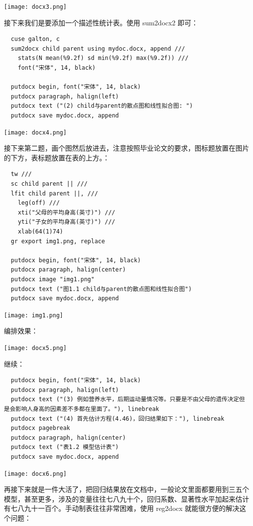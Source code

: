 \documentclass[cn,fancy,blue,11pt]{elegantbook}
\begin{document}
\noindent\texttt{[image: docx3.png]}

接下来我们是要添加一个描述性统计表。使用 sum2docx2 即可：

\begin{lstlisting}
  cuse galton, c
  sum2docx child parent using mydoc.docx, append ///
  	stats(N mean(%9.2f) sd min(%9.2f) max(%9.2f)) ///
  	font("宋体", 14, black)

  putdocx begin, font("宋体", 14, black)
  putdocx paragraph, halign(left)
  putdocx text ("(2) child与parent的散点图和线性拟合图: ")
  putdocx save mydoc.docx, append
\end{lstlisting}

\noindent\texttt{[image: docx4.png]}

接下来第二题，画个图然后放进去，注意按照毕业论文的要求，图标题放置在图片的下方，表标题放置在表的上方。：

\begin{lstlisting}
  tw ///
  sc child parent || ///
  lfit child parent ||, ///
  	leg(off) ///
  	xti("父母的平均身高(英寸)") ///
  	yti("子女的平均身高(英寸)") ///
  	xlab(64(1)74)
  gr export img1.png, replace

  putdocx begin, font("宋体", 14, black)
  putdocx paragraph, halign(center)
  putdocx image "img1.png"
  putdocx text ("图1.1 child与parent的散点图和线性拟合图")
  putdocx save mydoc.docx, append
\end{lstlisting}

\noindent\texttt{[image: img1.png]}

编排效果：

\noindent\texttt{[image: docx5.png]}

继续：

\begin{lstlisting}
  putdocx begin, font("宋体", 14, black)
  putdocx paragraph, halign(left)
  putdocx text ("(3) 例如营养水平，后期运动量情况等。只要是不由父母的遗传决定但是会影响人身高的因素差不多都在里面了。"), linebreak
  putdocx text ("(4) 首先估计方程(4.46)，回归结果如下："), linebreak
  putdocx pagebreak
  putdocx paragraph, halign(center)
  putdocx text ("表1.2 模型估计表")
  putdocx save mydoc.docx, append
\end{lstlisting}

\noindent\texttt{[image: docx6.png]}

再接下来就是一件大活了，把回归结果放在文档中，一般论文里面都要用到三五个模型，甚至更多，涉及的变量往往七八九十个，回归系数、显著性水平加起来估计有七八九十一百个。手动制表往往非常困难，使用 reg2docx 就能很方便的解决这个问题：
\end{document}
